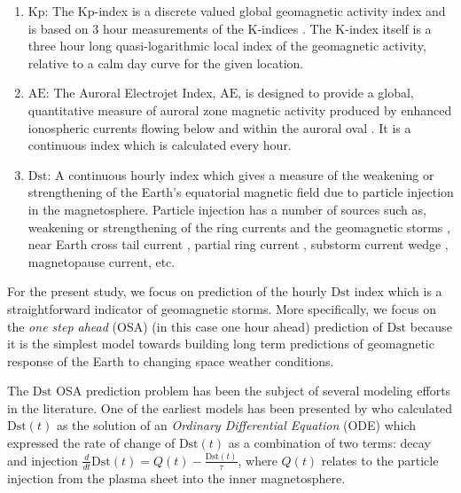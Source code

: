 \begin{enumerate}
    \item $\mathrm{Kp}$: The Kp-index is a discrete valued global geomagnetic activity index and is 
    based on 3 hour measurements of the K-indices \citep{Bartels}. The K-index itself is a three 
    hour long quasi-logarithmic local index of the geomagnetic activity, relative to a calm day 
    curve for the given location.
    
    \item $\mathrm{AE}$: The Auroral Electrojet Index, $\mathrm{AE}$, is designed to provide a 
    global, quantitative measure of auroral zone magnetic activity produced by enhanced ionospheric 
    currents flowing below and within the auroral oval \citep{AEIndex}. It is a continuous index 
    which is calculated every hour.
    
    \item $\mathrm{Dst}$: A continuous hourly index which gives a measure of the weakening or 
    strengthening of the Earth's equatorial magnetic field due to particle injection in the 
    magnetosphere. Particle injection has a number of sources such as, weakening or strengthening 
    of the ring currents and the geomagnetic storms \citep{DesslerAndParker}, near Earth cross tail 
    current \citep{ganushkina2004long,angeo-28-123-2010}, partial ring current 
    \citep{JGRA:JGRA15878}, substorm current wedge \citep{JGRA:JGRA15211}, magnetopause current, 
    etc. 
\end{enumerate}

For the present study, we focus on prediction of the hourly $\mathrm{Dst}$ index which is a 
straightforward indicator of geomagnetic storms. More specifically, we focus on the 
\emph{one step ahead} (OSA) (in this case one hour ahead) prediction of $\mathrm{Dst}$ because it 
is the simplest model towards building long term predictions of geomagnetic response of the Earth 
to changing space weather conditions. 

The $\mathrm{Dst}$ OSA prediction problem has been the subject of several modeling efforts in the 
literature. One of the earliest models has been presented by \citet{JGR:JGR10260} who calculated 
$\mathrm{Dst}(t)$ as the solution of an \emph{Ordinary Differential Equation} (ODE) which expressed 
the rate of change of $\mathrm{Dst}(t)$ as a combination of two terms: decay and injection 
$\frac{d}{dt} \mathrm{Dst}(t) = Q(t) - \frac{\mathrm{Dst}(t)}{\tau}$, where $Q(t)$ relates to the 
particle injection from the plasma sheet into the inner magnetosphere. 

